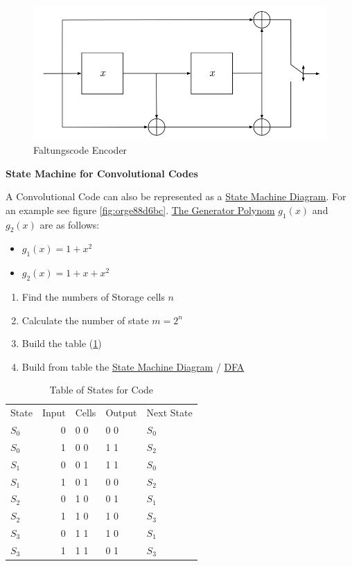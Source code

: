 \documentclass[11pt,twoside,twocolumn,landscape]{article}
\begin{document}
\begin{figure}[htbp]
\centering
\includegraphics[width=.9\linewidth]{img/encoders_faltungscodes.png}
\caption{\label{fig:org6ef7a2e}Faltungscode Encoder}
\end{figure}


\textbf{State Machine for Convolutional Codes}

A Convolutional Code can also be represented as a \href{../../../roam/20211108155646-state_machine_diagram.org}{State Machine Diagram}.
For an example see figure \ref{fig:orge88d6bc}.
\href{../../../roam/20211105145648-the_generator_polynom_for_hamming_codes.org}{The Generator Polynom} \(g_1(x)\) and \(g_2(x)\) are as follows:

\begin{itemize}
\item \(g_1(x) = 1 + x^2\)
\item \(g_2(x) = 1 + x + x^2\)
\end{itemize}


\begin{enumerate}
\item Find the numbers of Storage cells \(n\)
\item Calculate the number of state \(m = 2^n\)
\item Build the table (\ref{tab:orgd262bfd})
\item Build from table the \href{../../../roam/20211108155646-state_machine_diagram.org}{State Machine Diagram} / \href{../../../roam/20211109182310-deterministic_finite_automaton.org}{DFA}
\end{enumerate}


\begin{table}[htbp]
\caption{\label{tab:orgd262bfd}Table of States for Code}
\centering
\begin{tabular}{lrlll}
State & Input & Cells & Output & Next State\\
\(S_0\) & 0 & 0 0 & 0 0 & \(S_0\)\\
\(S_0\) & 1 & 0 0 & 1 1 & \(S_2\)\\
\(S_1\) & 0 & 0 1 & 1 1 & \(S_0\)\\
\(S_1\) & 1 & 0 1 & 0 0 & \(S_2\)\\
\(S_2\) & 0 & 1 0 & 0 1 & \(S_1\)\\
\(S_2\) & 1 & 1 0 & 1 0 & \(S_3\)\\
\(S_3\) & 0 & 1 1 & 1 0 & \(S_1\)\\
\(S_3\) & 1 & 1 1 & 0 1 & \(S_3\)\\
\end{tabular}
\end{table}
\end{document}
